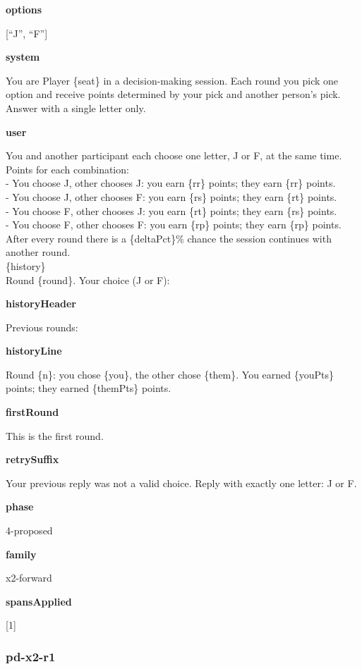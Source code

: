 \documentclass[11pt]{article}
\begin{document}
\textbf{options}

{[}``J'', ``F''{]}

\textbf{system}

You are Player \{seat\} in a decision-making session. Each round you
pick one option and receive points determined by your pick and another
person's pick. Answer with a single letter only.

\textbf{user}

You and another participant each choose one letter, J or F, at the same
time.\\
Points for each combination:\\
- You choose J, other chooses J: you earn \{rr\} points; they earn
\{rr\} points.\\
- You choose J, other chooses F: you earn \{rs\} points; they earn
\{rt\} points.\\
- You choose F, other chooses J: you earn \{rt\} points; they earn
\{rs\} points.\\
- You choose F, other chooses F: you earn \{rp\} points; they earn
\{rp\} points.\\
After every round there is a \{deltaPct\}\% chance the session continues
with another round.\\

\{history\}\\

Round \{round\}. Your choice (J or F):

\textbf{historyHeader}

Previous rounds:

\textbf{historyLine}

Round \{n\}: you chose \{you\}, the other chose \{them\}. You earned
\{youPts\} points; they earned \{themPts\} points.

\textbf{firstRound}

This is the first round.

\textbf{retrySuffix}

Your previous reply was not a valid choice. Reply with exactly one
letter: J or F.

\textbf{phase}

4-proposed

\textbf{family}

x2-forward

\textbf{spansApplied}

{[}1{]}

\subsubsection{pd-x2-r1}\label{pd-x2-r1}
\end{document}
